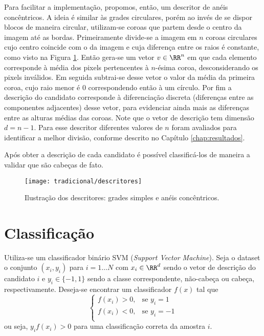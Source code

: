 Para facilitar a implementação, propomos, então, um descritor de anéis concêntricos. A ideia é similar às grades circulares, porém ao invés de se dispor blocos de maneira circular, utilizam-se coroas que partem desde o centro da imagem até as bordas. Primeiramente divide-se a imagem em $n$ coroas circulares cujo centro coincide com o da imagem e cuja diferença entre os raios é constante, como visto na Figura \ref{fig:descritores}. Então gera-se um vetor $v \in \RR^n$ em que cada elemento corresponde à média dos pixels pertencentes à $n$-ésima coroa, desconsiderando os pixels inválidos. Em seguida subtrai-se desse vetor o valor da média da primeira coroa, cujo raio menor é 0 correspondendo então à um círculo. Por fim a descrição do candidato corresponde à diferenciação discreta (diferenças entre as componentes adjacentes) desse vetor, para evidenciar ainda mais as diferenças entre as alturas médias das coroas. Note que o vetor de descrição tem dimensão $d=n-1$. Para esse descritor diferentes valores de $n$ foram avaliados para identificar a melhor divisão, conforme descrito no Capítulo \ref{chap:resultados}.

Após obter a descrição de cada candidato é possível classificá-los de maneira a validar que são cabeças de fato.

\begin{figure}
\centering
\texttt{[image: tradicional/descritores]}
\caption{Ilustração dos descritores: grades simples e anéis concêntricos.}
\label{fig:descritores}
\end{figure}

\section{Classificação}
\label{sec:classificacao:svm}

Utiliza-se um classificador binário SVM (\textit{Support Vector Machine}). Seja o dataset o conjunto $(x_i, y_i)$ para $i=1 \dots N$ com $x_i \in \RR^d$ sendo o vetor de descrição do candidato $i$ e $y_i \in \{-1, 1\}$ sendo a classe correspondente, não-cabeça ou cabeça, respectivamente. Deseja-se encontrar um classificador $f(x)$ tal que 
\begin{equation*}
\label{eq:svm-decision}
	\begin{cases}
		f(x_i)>0,& \text{se } y_i=1 \\
		f(x_i)<0,& \text{se } y_i=-1 \\
	\end{cases}
\end{equation*}
 ou seja, $y_i f(x_i) > 0$ para uma classificação correta da amostra $i$. 

